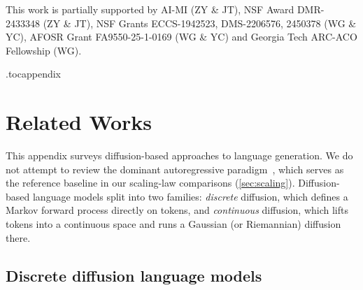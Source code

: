 \documentclass{article}
\begin{document}
This work is partially supported by AI-MI (ZY \& JT), NSF Award DMR-2433348 (ZY \& JT), NSF Grants ECCS-1942523, DMS-2206576, 2450378 (WG \& YC), AFOSR Grant FA9550-25-1-0169 (WG \& YC) and Georgia Tech ARC-ACO Fellowship (WG).

%

%

%

%




%


%

%

%


%

%

%

%




\clearpage

\appendix
{}

\etocdepthtag.toc{appendix}  %
\tableofcontents

\clearpage
%
%
%

%

%
%

%
%

%
%

%
%

\section{Related Works}\label{app:related-works}

%

This appendix surveys diffusion-based approaches to language generation. We do not attempt to review the dominant autoregressive paradigm~\citep{vaswani2017attention,radford2019language}, which serves as the reference baseline in our scaling-law comparisons (\cref{sec:scaling}). Diffusion-based language models split into two families: \emph{discrete} diffusion, which defines a Markov forward process directly on tokens, and \emph{continuous} diffusion, which lifts tokens into a continuous space and runs a Gaussian (or Riemannian) diffusion there.

\subsection{Discrete diffusion language models}
\end{document}

